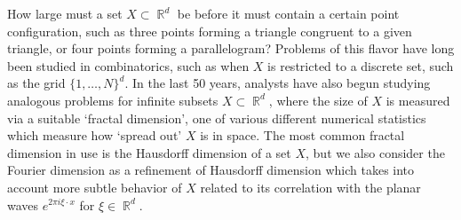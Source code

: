 \documentclass[11pt]{article}
\DeclareMathOperator{\RR}{\mathbb{R}}
\begin{document}
How large must a set $X \subset \RR^d$ be before it must contain a certain point configuration, such as three points forming a triangle congruent to a given triangle, or four points forming a parallelogram? Problems of this flavor have long been studied in combinatorics, such as when $X$ is restricted to a discrete set, such as the grid $\{ 1, \dots, N \}^d$. In the last 50 years, analysts have also begun studying analogous problems for infinite subsets $X \subset \RR^d$, where the size of $X$ is measured via a suitable `fractal dimension', one of various different numerical statistics which measure how `spread out' $X$ is in space. The most common fractal dimension in use is the Hausdorff dimension of a set $X$, but we also consider the Fourier dimension as a refinement of Hausdorff dimension which takes into account more subtle behavior of $X$ related to its correlation with the planar waves $e^{2 \pi i \xi \cdot x}$ for $\xi \in \RR^d$. 
\end{document}
